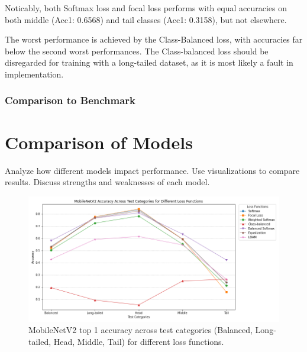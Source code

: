 Noticably, both Softmax loss and focal loss performs with equal accuracies on both middle (Acc1: 0.6568) and tail classes (Acc1: 0.3158), but not elsewhere. 

The worst performance is achieved by the Class-Balanced loss, with accuracies far below the second worst performances. The Class-balanced loss should be disregarded for training with a long-tailed dataset, as it is most likely a fault in implementation. 


\subsubsection{Comparison to Benchmark}

\section{Comparison of Models}
Analyze how different models impact performance.
Use visualizations to compare results.
Discuss strengths and weaknesses of each model.

\begin{figure}[h!]
    \centering
    \includegraphics[width=\textwidth]{Images/Plots/mobilenet_lt_loss_comparison_line.png}
    \caption{MobileNetV2 top 1 accuracy across test categories (Balanced, Long-tailed, Head, Middle, Tail) for different loss functions.}
    \label{fig:mobilenet_bal_loss_comparison_line}
\end{figure}

